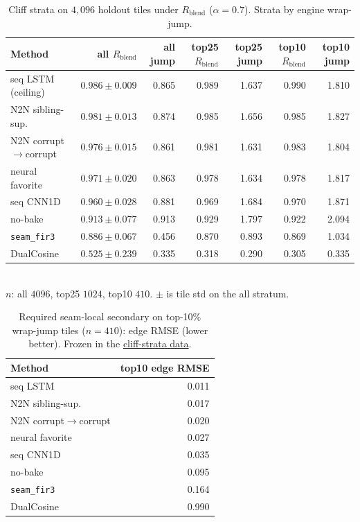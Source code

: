\begin{table}[t]
  \centering
  \caption{Cliff strata on $4{,}096$ holdout tiles under $R_{\mathrm{blend}}$ ($\alpha{=}0.7$). Strata by engine wrap-jump.}
  \label{tab:cliff-strata}
  \setlength{\tabcolsep}{2.5pt}
  \begin{tabular}{@{}lrrrrrr@{}}
    \toprule
    Method & all $R_{\mathrm{blend}}$ & all jump & top25 $R_{\mathrm{blend}}$ & top25 jump & top10 $R_{\mathrm{blend}}$ & top10 jump \\
    \midrule
    seq LSTM (ceiling) & $0.986\pm0.009$ & 0.865 & 0.989 & 1.637 & 0.990 & 1.810 \\
    N2N sibling-sup. & $0.981\pm0.013$ & 0.874 & 0.985 & 1.656 & 0.985 & 1.827 \\
    N2N corrupt$\to$corrupt & $0.976\pm0.015$ & 0.861 & 0.981 & 1.631 & 0.983 & 1.804 \\
    neural favorite & $0.971\pm0.020$ & 0.863 & 0.978 & 1.634 & 0.978 & 1.817 \\
    seq CNN1D & $0.960\pm0.028$ & 0.881 & 0.969 & 1.684 & 0.970 & 1.871 \\
    no-bake & $0.913\pm0.077$ & 0.913 & 0.929 & 1.797 & 0.922 & 2.094 \\
    \texttt{seam\_fir3} & $0.886\pm0.067$ & 0.456 & 0.870 & 0.893 & 0.869 & 1.034 \\
    DualCosine & $0.525\pm0.239$ & 0.335 & 0.318 & 0.290 & 0.305 & 0.335 \\
    \bottomrule
  \end{tabular}\\[0.3em]
  {\footnotesize $n$: all $4096$, top25 $1024$, top10 $410$. $\pm$ is tile std on the all stratum.}
\end{table}

\begin{table}[t]
  \centering
  \caption{Required seam-local secondary on top-10\% wrap-jump tiles ($n{=}410$): edge RMSE (lower better). Frozen in the \href{https://github.com/reeldemo/denoise-opt-meta/blob/master/paper/Unsupervised_Wavetable_Seam_Artifact_Repair_via_Hybrid_GA-PPO_Meta-Search_v11/figures/cliff_strata.json}{cliff-strata data}.}
  \label{tab:cliff-edge-rmse}
  \setlength{\tabcolsep}{3pt}
  \begin{tabular}{@{}lr@{}}
    \toprule
    Method & top10 edge RMSE \\
    \midrule
    seq LSTM & 0.011 \\
    N2N sibling-sup. & 0.017 \\
    N2N corrupt$\to$corrupt & 0.020 \\
    neural favorite & 0.027 \\
    seq CNN1D & 0.035 \\
    no-bake & 0.095 \\
    \texttt{seam\_fir3} & 0.164 \\
    DualCosine & 0.990 \\
    \bottomrule
  \end{tabular}
\end{table}

